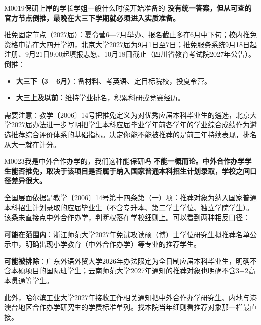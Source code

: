\begin{qa}{M0019}{保研上岸的学长学姐一般什么时候开始准备的}
\textbf{没有统一答案，但从可查的官方节点倒推，最晚在大三下学期就必须进入实质准备。}

推免固定节点（2027届）：夏令营6—7月举办、报名截止多在6月中下旬；校内推免资格申请在大四开学初，北京大学2027届为9月1日至7日；推免服务系统9月18日起注册、9月21日9:00起填报志愿、10月18日截止（四川省教育考试院2027年公告）。倒推：

\begin{itemize}
  \item \textbf{大三下（3—6月）}：备材料、考英语、定目标院校，投夏令营。
  \item \textbf{大三上及以前}：维持学业排名，积累科研或竞赛经历。
\end{itemize}

需要注意：教学〔2006〕14号把推免定义为对优秀应届本科毕业生的遴选，北京大学2027届办法进一步写明把学生本科应届毕业学年前各学年的学业综合成绩作为遴选推荐综合评价体系的基础指标。决定你能不能被推荐的是前三年持续表现，排名从大一就在计分。
\end{qa}

\begin{qa}{M0023}{我是中外合作办学的，我们这种能保研吗}
\textbf{不能一概而论。中外合作办学学生能否推免，取决于该项目是否属于纳入国家普通本科招生计划录取，学校之间口径差异很大。}

全国层面依据是教学〔2006〕14号第十四条第（一）项：推荐对象为纳入国家普通本科招生计划录取的应届毕业生（不含专升本、第二学士学位、独立学院学生）。该条未直接点中外合作办学，判断权落在学校细则上。可以看到两种相反口径：

\textbf{可能在范围内}：浙江师范大学2027年免试攻读硕（博）士学位研究生拟推荐名单公示中，明确出现小学教育（中外合作办学）等专业的推荐学生。

\textbf{可能被排除}：广东外语外贸大学2026年办法限定为全日制应届本科毕业生，明确不含本硕项目的国际班学生；云南师范大学2027年通知的推荐对象也明确不含3+2高本贯通等学生。

此外，哈尔滨工业大学2027年接收工作相关通知把中外合作办学研究生、内地与港澳台地区合作办学研究生的学费标准单列。找本院当年细则看推荐对象那一栏最直接。
\end{qa}


